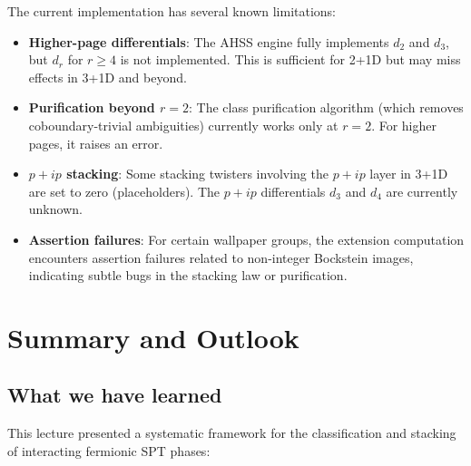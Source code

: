 \documentclass{SciPost}
\theoremstyle{definition}
\begin{document}
The current implementation has several known limitations:
\begin{itemize}
    \item \textbf{Higher-page differentials}: The AHSS engine fully implements $d_2$ and $d_3$, but $d_r$ for $r \geq 4$ is not implemented. This is sufficient for 2+1D but may miss effects in 3+1D and beyond.
    \item \textbf{Purification beyond $r = 2$}: The class purification algorithm (which removes coboundary-trivial ambiguities) currently works only at $r = 2$. For higher pages, it raises an error.
    \item \textbf{$p + ip$ stacking}: Some stacking twisters involving the $p + ip$ layer in 3+1D are set to zero (placeholders). The $p + ip$ differentials $d_3$ and $d_4$ are currently unknown.
    \item \textbf{Assertion failures}: For certain wallpaper groups, the extension computation encounters assertion failures related to non-integer Bockstein images, indicating subtle bugs in the stacking law or purification.
\end{itemize}


\section{Summary and Outlook}
\label{sec:outlook}

\subsection{What we have learned}

This lecture presented a systematic framework for the classification and stacking of interacting fermionic SPT phases:
\end{document}
